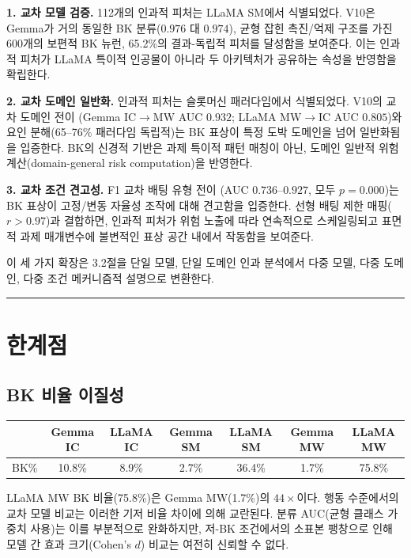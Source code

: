 \documentclass[11pt,a4paper]{article}
\begin{document}
\medskip\noindent\textbf{1. 교차 모델 검증.} 112개의 인과적 피처는 LLaMA SM에서 식별되었다. V10은 Gemma가 거의 동일한 BK 분류($0.976$ 대 $0.974$), 균형 잡힌 촉진/억제 구조를 가진 600개의 보편적 BK 뉴런, 65.2\%의 결과-독립적 피처를 달성함을 보여준다. 이는 인과적 피처가 LLaMA 특이적 인공물이 아니라 두 아키텍처가 공유하는 속성을 반영함을 확립한다.

\medskip\noindent\textbf{2. 교차 도메인 일반화.} 인과적 피처는 슬롯머신 패러다임에서 식별되었다. V10의 교차 도메인 전이 (Gemma IC$\rightarrow$MW AUC $0.932$; LLaMA MW$\rightarrow$IC AUC $0.805$)와 요인 분해(65--76\% 패러다임 독립적)는 BK 표상이 특정 도박 도메인을 넘어 일반화됨을 입증한다. BK의 신경적 기반은 과제 특이적 패턴 매칭이 아닌, 도메인 일반적 위험 계산(domain-general risk computation)을 반영한다.

\medskip\noindent\textbf{3. 교차 조건 견고성.} F1 교차 배팅 유형 전이 (AUC $0.736$--$0.927$, 모두 $p=0.000$)는 BK 표상이 고정/변동 자율성 조작에 대해 견고함을 입증한다. 선형 배팅 제한 매핑($r > 0.97$)과 결합하면, 인과적 피처가 위험 노출에 따라 연속적으로 스케일링되고 표면적 과제 매개변수에 불변적인 표상 공간 내에서 작동함을 보여준다.

\medskip\noindent 이 세 가지 확장은 3.2절을 단일 모델, 단일 도메인 인과 분석에서 다중 모델, 다중 도메인, 다중 조건 메커니즘적 설명으로 변환한다.

\bigskip\hrule\bigskip

\section{한계점}

\subsection{BK 비율 이질성}

\begin{table}[H]
\centering
\footnotesize
\begin{tabular}{lcccccc}
\toprule
 & Gemma IC & LLaMA IC & Gemma SM & LLaMA SM & Gemma MW & LLaMA MW \\
\midrule
BK\% & 10.8\% & 8.9\% & 2.7\% & 36.4\% & 1.7\% & 75.8\% \\
\bottomrule
\end{tabular}
\end{table}

\noindent LLaMA MW BK 비율(75.8\%)은 Gemma MW(1.7\%)의 $44\times$이다. 행동 수준에서의 교차 모델 비교는 이러한 기저 비율 차이에 의해 교란된다. 분류 AUC(균형 클래스 가중치 사용)는 이를 부분적으로 완화하지만, 저-BK 조건에서의 소표본 팽창으로 인해 모델 간 효과 크기(Cohen's $d$) 비교는 여전히 신뢰할 수 없다.
\end{document}
